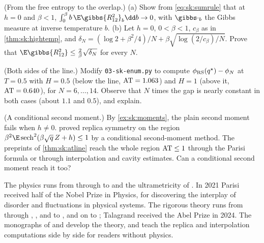\begin{refsection}
\begin{exercises}
\item \translate\hard (From the free entropy to the overlap.) (a) Show from \eqref{eq:sk:sumrule} that at $h=0$ and $\beta<1$, $\int_0^\beta b\,\E\gibbs{R_{12}^2}_b\dd b\to0$, with $\gibbs\cdot_b$ the Gibbs measure at inverse temperature $b$. (b) Let $h=0$, $0<\beta<1$, $c_\beta$ as in \cref{thm:sk:hightemp}, and $\delta_N=(\log2+\beta^2/4)/N+\beta\sqrt{\log(2/c_\beta)/N}$. Prove that $\E\gibbs{R_{12}^2}\le\frac2\beta\sqrt{\delta_N}$ for every $N$. \label{ex:sk:overlapfromphi}

\item \measurement (Both sides of the line.) Modify \texttt{03-sk-enum.py} to compute $\phi_{\mathrm{RS}}(q^\star)-\phi_N$ at $T=0.5$ with $H=0.5$ (below the line, $\mathrm{AT}=1.063$) and $H=1$ (above it, $\mathrm{AT}=0.640$), for $N=6,\dots,14$. Observe that $N$ times the gap is nearly constant in both cases (about $1.1$ and $0.5$), and explain.\label{ex:sk:fieldmeasure}

\item \research (A conditional second moment.) By \cref{ex:sk:moments}, the plain second moment fails when $h\ne0$. \textcite{BrenneckeYau2022} proved replica symmetry on the region $\beta^2\E\sksech^2(\beta\sqrt q\,Z+h)\le1$ by a conditional second-moment method. The preprints of \cref{thm:sk:atline} reach the whole region $\mathrm{AT}\le1$ through the Parisi formula or through interpolation and cavity estimates. Can a conditional second moment reach it too?\label{ex:sk:conditional}
\end{exercises}

\notesandrefs
The physics runs from \textcite{SherringtonKirkpatrick1975} through \textcite{deAlmeidaThouless1978} to \textcite{Parisi1979b,Parisi1980b,Parisi1983} and the ultrametricity of \textcite{MezardEtAl1984a}. In 2021 Parisi received half of the Nobel Prize in Physics, for discovering the interplay of disorder and fluctuations in physical systems. The rigorous theory runs from \textcite{AizenmanLebowitzRuelle1987} through \textcite{GuerraToninelli2002}, \textcite{Guerra2003}, \textcite{Toninelli2002} and \textcite{AizenmanSimsStarr2003} to \textcite{Talagrand2006}, and on to \textcite{Panchenko2013a,Panchenko2014}; Talagrand received the Abel Prize in 2024. The monographs of \textcite{Talagrand2011a} and \textcite{Panchenko2013b} develop the theory, and \textcite{MontanariSen2024} teach the replica and interpolation computations side by side for readers without physics.


\end{refsection}
